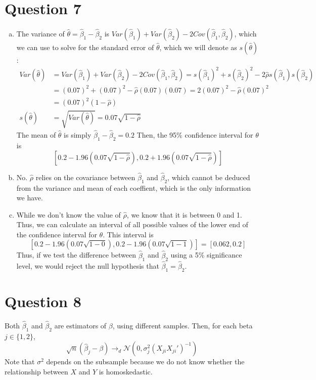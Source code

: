 \documentclass{article}
\newcommand{\N}{\mathcal{N}}
\newcommand{\bhat}{\hat{\beta}}
\begin{document}
\section*{Question 7}
\begin{enumerate}[(a)]
	\item The variance of ${\hat{\theta}=\bhat_1-\bhat_2}$ is ${Var(\bhat_1) + Var(\bhat_2) - 2Cov(\bhat_1,\bhat_2)}$, which we can use to solve for the standard error of $\hat{\theta}$, which we will denote as $s(\hat{\theta})$:
		\begin{align*}
			Var(\hat{\theta})	&= Var(\bhat_1) + Var(\bhat_2) - 2Cov(\bhat_1,\bhat_2) = s(\bhat_1)^2 + s(\bhat_2)^2 - 2\hat{\rho}s(\bhat_1)s(\bhat_2)	\\
								&= (0.07)^2 + (0.07)^2 - \hat{\rho}(0.07)(0.07) = 2(0.07)^2  - \hat{\rho}(0.07)^2 	\\
								&= (0.07)^2(1-\hat{\rho})																	\\
			s(\hat{\theta}) 	&= \sqrt{Var(\hat{\theta})}	 = 0.07\sqrt{1-\hat{\rho}}
		\end{align*}
		The mean of $\hat{\theta}$ is simply ${\bhat_1-\bhat_2=0.2}$ Then, the 95\% confidence interval for $\theta$ is
		\[
			\left[0.2-1.96\left(0.07\sqrt{1-\hat{\rho}}\right),0.2+1.96\left(0.07\sqrt{1-\hat{\rho}}\right)\right]
		\]
	
	\item No. $\hat{\rho}$ relies on the covariance between $\bhat_1$ and $\bhat_2$, which cannot be deduced from the variance and mean of each coeffient, which is the only information we have.
	
	\item While we don't know the value of $\hat{\rho}$, we know that it is between 0 and 1. Thus, we can calculate an interval of all possible values of the lower end of the confidence interval for $\theta$. This interval is
		\[
			[0.2-1.96\left(0.07\sqrt{1-0}\right),0.2-1.96\left(0.07\sqrt{1-1}\right)] = [0.062,0.2]
		\]
		Thus, if we test the difference between $\bhat_1$ and $\bhat_2$ using a 5\% significance level, we would reject the null hypothesis that ${\bhat_1=\bhat_2}$.
	
\end{enumerate}


\section*{Question 8}
Both $\bhat_1$ and $\bhat_2$ are estimators of $\beta$, using different samples. Then, for each beta ${j\in\{1,2\}}$,
	\[
		\sqrt{n}(\bhat_j-\beta)\rightarrow_d\N\left(0,\sigma_j^2(X_{ji}X_{ji}')^{-1}\right)
	\]
Note that $\sigma^2$ depends on the subsample because we do not know whether the relationship between $X$ and $Y$ is homoskedastic.
\end{document}
